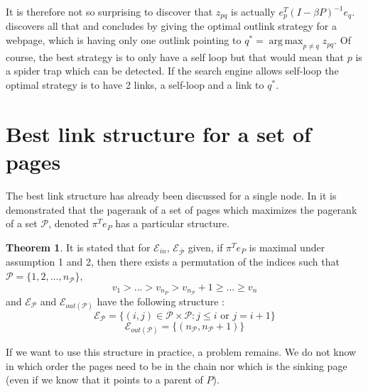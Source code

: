\documentclass{article}
\DeclareMathOperator*{\argmax}{arg\,max}
\newcommand{\1}{\mathbf{1}}
\theoremstyle{definition}
\newtheorem{mytheo}[mydef]{Theorem}
\begin{document}
It is therefore not so surprising to discover that $z_{pq}$ is actually $e_p^T(I-\beta P)^{-1}e_q$.
\cite{avrachenkov2006effect} discovers all that and concludes by giving the optimal outlink strategy for a webpage, which is having only one outlink pointing to $q^* = \argmax_{p \neq q} z_{pq}$.
Of course, the best strategy is to only have a self loop but that would mean that $p$ is a spider trap which can be detected.
If the search engine allows self-loop the optimal strategy is to have 2 links, a self-loop and a link to $q^*$.



\section{Best link structure for a set of pages}
The best link structure has already been discussed for a single node.
In \cite{de2008maximizing} it is demonstrated that the pagerank of a set of pages which maximizes the pagerank of a set $\mathcal{P}$, denoted $\pi^T e_{P}$ has a particular structure.\\
\begin{mytheo}
It is stated that for $\mathcal{E}_{in}$, $\mathcal{E}_{\overline{\mathcal{P}}}$ given, if  $\pi^T e_{P}$ is maximal under assumption 1 and 2, then there exists a permutation of the indices such that 
$\mathcal{P} = \{1,2, \hdots, n_{\mathcal{P}}\}$,
$$ v_1 > ... > v_{n_P}>v_{n_{\mathcal{P}}}+1 \geq ... \geq v_n$$
and $\mathcal{E}_{\mathcal{P}}$ and $\mathcal{E}_{out(\mathcal{P})} $ have the following structure :
$$\mathcal{E}_{\mathcal{P}} = \{(i,j) \in \mathcal{P}\times \mathcal{P} : j \leq i \text{ or }j = i+1 \}$$
$$\mathcal{E}_{out(\mathcal{P})} = \{(n_{\mathcal{P}},n_{\mathcal{P}}+1)\}$$
\label{thm:optstruct}
\end{mytheo}

If we want to use this structure in practice, a problem remains.
We do not know in which order the pages need to be in the chain
nor which is the sinking page (even if we know that it points to a parent of $P$).\\
\end{document}
